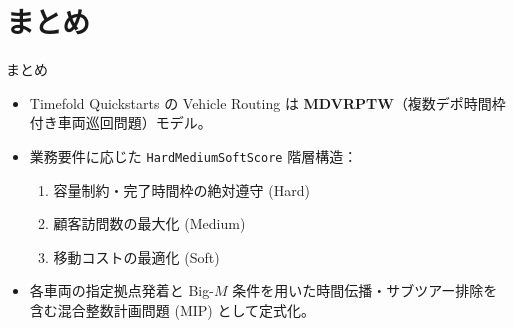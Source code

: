 \documentclass[aspectratio=169,11pt]{beamer}
\begin{document}
\section{まとめ}

\begin{frame}{まとめ}
  \begin{itemize}
    \item Timefold Quickstarts の Vehicle Routing は \textbf{MDVRPTW}（複数デポ時間枠付き車両巡回問題）モデル。
    \item 業務要件に応じた \texttt{HardMediumSoftScore} 階層構造：
      \begin{enumerate}
        \item 容量制約・完了時間枠の絶対遵守 (Hard)
        \item 顧客訪問数の最大化 (Medium)
        \item 移動コストの最適化 (Soft)
      \end{enumerate}
    \item 各車両の指定拠点発着と Big-$M$ 条件を用いた時間伝播・サブツアー排除を含む混合整数計画問題 (MIP) として定式化。
  \end{itemize}
\end{frame}
\end{document}
